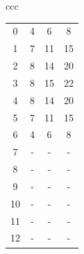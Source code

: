 \documentclass[11pt]{article}
\begin{document}
\begin{itemize}
\begin{itemize}
\begin{table}[H]
\begin{tabular}{ccc}
\begin{tabular}{|c|c|c|c|}
	\hline
	0 & 4 & 6 & 8 \\
	1 & 7 & 11 & 15 \\
	2 & 8 & 14 & 20 \\
	3 & 8 & 15 & 22 \\
	4 & 8 & 14 & 20 \\
	5 & 7 & 11 & 15 \\
	6 & 4 & 6 & 8 \\
	7 & - & - & - \\
	8 & - & - & - \\
	9 & - & - & - \\
	10 & - & - & - \\
	11 & - & - & - \\
	12 & - & - & - \\
	\hline
\end{tabular}
\end{tabular}

\vspace{1em}


\end{table}
\end{itemize}
\end{itemize}
\end{document}
